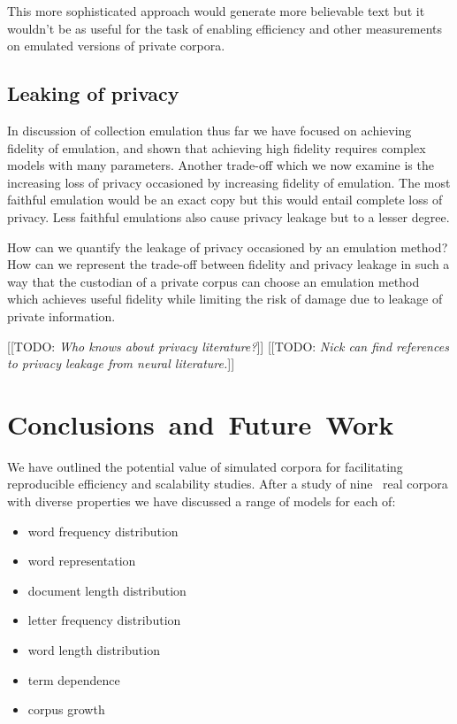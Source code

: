 \documentclass[11pt]{report}
\newcommand{\todo}[1]{{\color{blue}[[TODO: {\emph{#1}}]]}}
\newcommand{\numcolls}{nine}
\begin{document}
This more sophisticated approach would generate more believable text
but it wouldn't be as useful for the task of enabling efficiency and
other measurements on emulated versions of private corpora.   

\section{Leaking of privacy} 
\label{Privacy}
In discussion of collection emulation thus far we have focused on 
achieving fidelity of emulation, and shown that achieving high
fidelity requires complex models with many parameters.  Another
trade-off which we now examine is the increasing loss of privacy
occasioned by increasing fidelity of emulation.   The most faithful
emulation would be an exact copy but this would entail complete loss
of privacy.  Less faithful emulations also cause privacy leakage but
to a lesser degree.

How can we quantify the leakage of privacy occasioned by an emulation
method? How can we represent the trade-off between fidelity and
privacy leakage in such a way that the custodian of a private corpus can
choose an emulation method which achieves useful fidelity while
limiting the risk of damage due to leakage of private information. 

\todo{Who knows about privacy literature?}
\todo{Nick can find references to privacy leakage from neural literature.}


\chapter{Conclusions~and~Future~Work} %
\label{Conclusions}

We have outlined the potential value of simulated corpora for
facilitating reproducible efficiency and scalability 
studies.  After a study of \numcolls~ real corpora with diverse properties
we have discussed a range of models for each of:
\begin{itemize}
\item word frequency distribution
\item word representation
\item document length distribution
\item letter frequency distribution
\item word length distribution
\item term dependence
\item corpus growth
\end{itemize}
  
\end{document}
